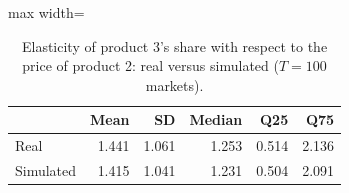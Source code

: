 \begin{table}[H]
\centering\small
\caption{Elasticity of product 3's share with respect to the price of product 2: real versus simulated ($T=100$ markets).}\label{tab:q8d_cell_32}
\begin{adjustbox}{max width=\linewidth}
\begin{tabular}{lrrrrr}
\toprule
 & Mean & SD & Median & Q25 & Q75 \\
\midrule
Real & 1.441 & 1.061 & 1.253 & 0.514 & 2.136 \\
Simulated & 1.415 & 1.041 & 1.231 & 0.504 & 2.091 \\
\bottomrule
\end{tabular}
\end{adjustbox}
\par\vspace{3pt}{\footnotesize Element $(3,2)$ of the elasticity matrix $\partial s_j/\partial p_k\cdot p_k/s_j$ across the 100 markets; simulated uses the Q8c estimates, real uses the true parameters.}
\end{table}
